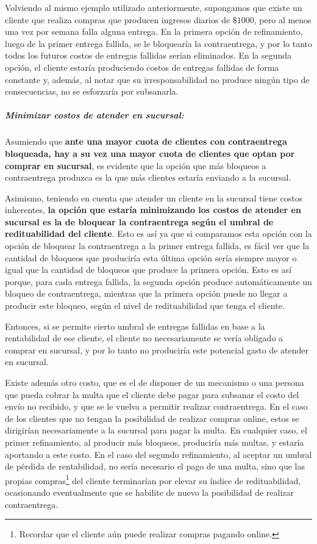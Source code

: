Volviendo al mismo ejemplo utilizado anteriormente, supongamos que existe un
cliente que realiza compras que producen ingresos diarios de $\$1000$, pero al
menos una vez por semana falla alguna entrega. En la primera opción de
refinamiento, luego de la primer entrega fallida, se le bloquearía la
contraentrega, y por lo tanto todos los futuros costos de entregas fallidas
serían eliminados. En la segunda opción, el cliente estaría produciendo costos
de entregas fallidas de forma constante y, además, al notar que su
irresponsabilidad no produce ningún tipo de consecuencias, no se esforzaría
por subsanarla.

\subparagraph{Minimizar costos de atender en sucursal:}

Asumiendo que \textbf{ante una mayor cuota de clientes con contraentrega
bloqueada, hay a su vez una mayor cuota de clientes que optan por comprar en
sucursal}, es evidente que la opción que más bloqueos a contraentrega produzca
es la que más clientes estaría enviando a la sucursal.

Asimismo, teniendo en cuenta que atender un cliente en la sucursal tiene
costos inherentes, \textbf{la opción que estaría minimizando los costos de
atender en sucursal es la de bloquear la contraentrega según el umbral de
redituabilidad del cliente}. Esto es así ya que si comparamos esta opción con
la opción de bloquear la contraentrega a la primer entrega fallida, es fácil
ver que la cantidad de bloqueos que produciría esta última opción sería
siempre mayor o igual que la cantidad de bloqueos que produce la primera
opción. Esto es así porque, para cada entrega fallida, la segunda opción
produce automáticamente un bloqueo de contraentrega, mientras que la primera
opción puede no llegar a producir este bloqueo, según el nivel de
redituabilidad que tenga el cliente.

Entonces, si se permite cierto umbral de entregas fallidas en base a la
rentabilidad de ese cliente, el cliente no necesariamente se vería obligado a
comprar en sucursal, y por lo tanto no produciría este potencial gasto de
atender en sucursal.

Existe además otro costo, que es el de disponer de un mecanismo o una persona
que pueda cobrar la multa que el cliente debe pagar para subsanar el costo del
envío no recibido, y que se le vuelva a permitir realizar contraentrega. En el
caso de los clientes que no tengan la posibilidad de realizar compras online,
estos se dirigirían necesariamente a la sucursal para pagar la multa. En
cualquier caso, el primer refinamiento, al producir más bloqueos, produciría
más multas, y estaría aportando a este costo. En el caso del segundo
refinamiento, al aceptar un umbral de pérdida de rentabilidad, no sería
necesario el pago de una multa, sino que las propias compras\footnote{Recordar
que el cliente aún puede realizar compras pagando online.} del cliente
terminarían por elevar su índice de redituabilidad, ocasionando eventualmente
que se habilite de nuevo la posibilidad de realizar contraentrega.

